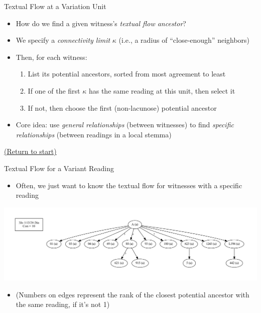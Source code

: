 \documentclass[10pt]{beamer}
\begin{document}
	\begin{frame}{Textual Flow at a Variation Unit}
		\begin{itemize}
			\item How do we find a given witness's \emph{textual flow ancestor}?
			\item We specify a \emph{connectivity limit} $\kappa$ (i.e., a radius of ``close-enough'' neighbors)
			\item Then, for each witness:
			\begin{enumerate}
				\item List its potential ancestors, sorted from most agreement to least
				\item If one of the first $\kappa$ has the same reading at this unit, then select it
				\item If not, then choose the first (non-lacunose) potential ancestor
			\end{enumerate}
			\item Core idea: use \emph{general relationships} (between witnesses) to find \emph{specific relationships} (between readings in a local stemma)
		\end{itemize}
		\begin{center}
			\hyperlink{slide:crossroad}{(Return to start)}
		\end{center}
	\end{frame}
	\begin{frame}{Textual Flow for a Variant Reading}\label{slide:textual-flow-reading}
		\begin{itemize}
			\item Often, we just want to know the textual flow for witnesses with a specific reading
		\end{itemize}
		\begin{center}
			\includegraphics[width=\textwidth]{../graphics/B25K1V13U24-26Ra-coherence-attestations.pdf}
		\end{center}
		\begin{itemize}
			\item (Numbers on edges represent the rank of the closest potential ancestor with the same reading, if it's not 1)
		\end{itemize}
	\end{frame}
\end{document}
